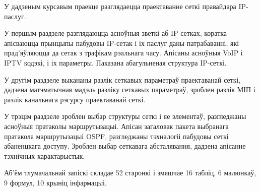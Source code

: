 \thispagestyle{empty} %

У дадзеным курсавым праекце разглядаецца праектаванне сеткі правайдара
IP-паслуг.

У першым раздзеле разглядаюцца асноўныя зветкі аб IP-сетках, коратка
апісваюцца прынцыпы пабудовы IP-сетак і іх паслуг даны патрабаванні, які
прад'яўляюцца да сетак з трафікам рэальнага часу. Апісаны асноўныя
VoIP і IPTV кодэкі, і іх параметры. Паказана абагульненая структура IP-сеткі.

У другім раздзеле выкананы разлік сеткавых параметраў праектаванай сеткі,
дадзена матэматычная мадэль разліку сеткавых параметраў, зроблен разлік
МІП і разлік канальнага рэсурсу праектаванай сеткі.

У трэцім раздзеле зроблен выбар структуры сеткі і яе элементаў,
разгледжаны асноўныя пратаколы маршрутызацыі. Апісан загаловак пакета
выбранага пратакола маршрутызацыі OSPF, разгледжаны тэхналогіі
пабудовы сеткі абаненцкага доступу. Зроблен выбар сеткавага абсталявання, дадзена апісанне тэхнічных характарыстык.

Аб'ём тлумачальнай запіскі складае 52 старонкі і змяшчае
16 табліц, 6 малюнкаў, 9 фор\-мул, 10 крыніц інфармацыі.
